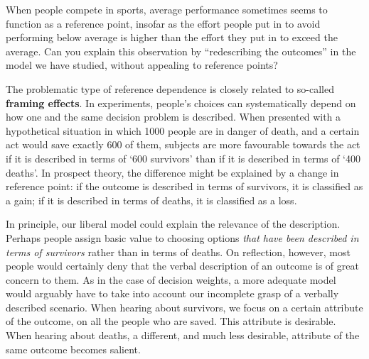 \begin{exercise}{1}
  When people compete in sports, average performance sometimes seems to function
  as a reference point, insofar as the effort people put in to avoid performing
  below average is higher than the effort they put in to exceed the average.%
  Can you explain this observation by ``redescribing the outcomes'' in the model
  we have studied, without appealing to reference points?
\end{exercise}


The problematic type of reference dependence is closely related to so-called
\textbf{framing effects}. In experiments, people's choices can systematically
depend on how one and the same decision problem is described. When presented
with a hypothetical situation in which 1000 people are in danger of death, and a
certain act would save exactly 600 of them, subjects are more favourable towards
the act if it is described in terms of `600 survivors' than if it is described
in terms of `400 deaths'. In prospect theory, the difference might be explained
by a change in reference point: if the outcome is described in terms of
survivors, it is classified as a gain; if it is described in terms of deaths, it
is classified as a loss.

In principle, our liberal model could explain the relevance of the description.
Perhaps people assign basic value to choosing options \emph{that have been
  described in terms of survivors} rather than in terms of deaths. On
reflection, however, most people would certainly deny that the verbal
description of an outcome is of great concern to them. As in the case of
decision weights, a more adequate model would arguably have to take into account
our incomplete grasp of a verbally described scenario. When hearing about
survivors, we focus on a certain attribute of the outcome, on all the people who
are saved. This attribute is desirable. When hearing about deaths, a different,
and much less desirable, attribute of the same outcome becomes salient.

